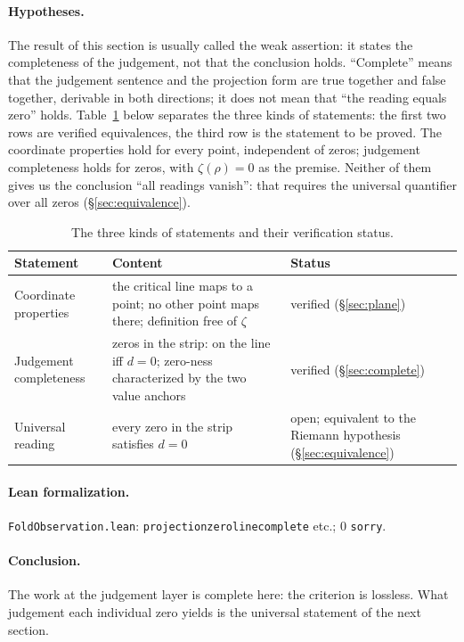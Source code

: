 \documentclass{article}
\renewcommand{\_}{\underscoreOrig\allowbreak}
\newcommand{\zt}{\zeta}
\begin{document}
\paragraph{Hypotheses.} The result of this section is usually called the
weak assertion: it states the completeness of the judgement, not that the
conclusion holds. ``Complete'' means that the judgement sentence and the
projection form are true together and false together, derivable in both
directions; it does not mean that ``the reading equals zero'' holds.
Table~\ref{tab:status} below separates the three kinds of statements:
the first two rows are verified equivalences, the third row is the
statement to be proved. The coordinate properties hold for every point,
independent of zeros; judgement completeness holds for zeros, with
$\zt(\rho)=0$ as the premise. Neither of them gives us the conclusion
``all readings vanish'': that requires the universal quantifier over all
zeros (\S\ref{sec:equivalence}).

\begin{table}[h]
\centering
\begin{tabular}{@{}>{\raggedright\arraybackslash}p{}@{\quad}>{\raggedright\arraybackslash}p{}@{\quad}>{\raggedright\arraybackslash}p{}@{}}
\hline
Statement & Content & Status \\
\hline
Coordinate properties & the critical line maps to a point; no other point maps there; definition free of $\zt$ & verified (\S\ref{sec:plane}) \\
Judgement completeness & zeros in the strip: on the line iff $d=0$; zero-ness characterized by the two value anchors & verified (\S\ref{sec:complete}) \\
Universal reading & every zero in the strip satisfies $d=0$ & open; equivalent to the Riemann hypothesis (\S\ref{sec:equivalence}) \\
\hline
\end{tabular}
\caption{The three kinds of statements and their verification status.}
\label{tab:status}
\end{table}

\paragraph{Lean formalization.} \texttt{FoldObservation.lean}:
\texttt{projection\_zero\_line\_complete} etc.; 0 \texttt{sorry}.

\paragraph{Conclusion.} The work at the judgement layer is complete here:
the criterion is lossless. What judgement each individual zero yields is
the universal statement of the next section.
\end{document}
